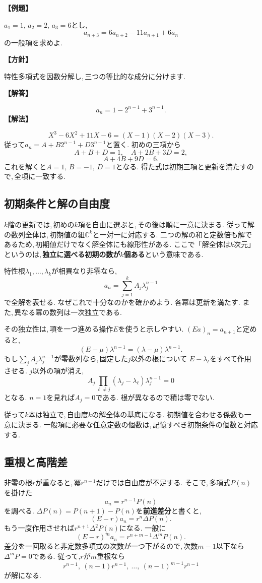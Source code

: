 \noindent\textbf{【例題】}\par\nobreak
$a_1=1,\,a_2=2,\,a_3=6$とし,
\[
 a_{n+3}=6a_{n+2}-11a_{n+1}+6a_n
\]
の一般項を求めよ.

\noindent\textbf{【方針】}\par\nobreak
特性多項式を因数分解し,\,三つの等比的な成分に分けます.

\noindent\textbf{【解答】}\par\nobreak
\[
 a_n=1-2^{n-1}+3^{n-1}.
\]
\noindent\textbf{【解法】}\par\nobreak
\[
 X^3-6X^2+11X-6=(X-1)(X-2)(X-3).
\]
従って$a_n=A+B2^{n-1}+D3^{n-1}$と置く.
初めの三項から
\[
 A+B+D=1,\quad A+2B+3D=2,
\]
\[
 A+4B+9D=6.
\]
これを解くと$A=1,\,B=-1,\,D=1$となる.
得た式は初期三項と更新を満たすので,\,全項に一致する.

\subsection{初期条件と解の自由度}\label{節：解の自由度}

$k$階の更新では,\,初めの$k$項を自由に選ぶと,\,その後は順に一意に決まる.
従って解の数列全体は,\,初期値の組$\mathbb C^k$と一対一に対応する.
二つの解の和と定数倍も解であるため,\,初期値だけでなく解全体にも線形性がある.
ここで「解全体は$k$次元」というのは,\,\textbf{独立に選べる初期の数が$k$個ある}という意味である.

特性根$\lambda_1,\ldots,\lambda_k$が相異なり非零なら,
\[
 a_n=\sum_{j=1}^{k}A_j\lambda_j^{n-1}
\]
で全解を表せる.
なぜこれで十分なのかを確かめよう.
各冪は更新を満たす. また,\,異なる冪の数列は一次独立である.

その独立性は,\,項を一つ進める操作$E$を使うと示しやすい.
$(Ea)_n=a_{n+1}$と定めると,
\[
 (E-\mu)\lambda^{n-1}
 =(\lambda-\mu)\lambda^{n-1}.
\]
もし$\sum_j A_j\lambda_j^{n-1}$が零数列なら,\,固定した$j$以外の根について
$E-\lambda_\ell$をすべて作用させる.
$j$以外の項が消え,
\[
 A_j\prod_{\ell\ne j}(\lambda_j-\lambda_\ell)
 \lambda_j^{n-1}=0
\]
となる. $n=1$を見れば$A_j=0$である.
根が異なるので積は零でない.

従って$k$本は独立で,\,自由度$k$の解全体の基底になる.
初期値を合わせる係数も一意に決まる.
一般項に必要な任意定数の個数は,\,記憶すべき初期条件の個数と対応する.

\subsection{重根と高階差}

非零の根$r$が重なると,\,冪$r^{n-1}$だけでは自由度が不足する.
そこで,\,多項式$P(n)$を掛けた
\[
 a_n=r^{n-1}P(n)
\]
を調べる. $\Delta P(n)=P(n+1)-P(n)$を\textbf{前進差分}と書くと,
\[
 (E-r)a_n=r^n\Delta P(n).
\]
もう一度作用させれば$r^{n+1}\Delta^2P(n)$になる.
一般に
\[
 (E-r)^m a_n=r^{n+m-1}\Delta^mP(n).
\]
差分を一回取ると非定数多項式の次数が一つ下がるので,\,次数$m-1$以下なら$\Delta^mP=0$である.
従って,$r$が$m$重根なら
\[
 r^{n-1},\ (n-1)r^{n-1},\ \ldots,\
 (n-1)^{m-1}r^{n-1}
\]
が解になる.

